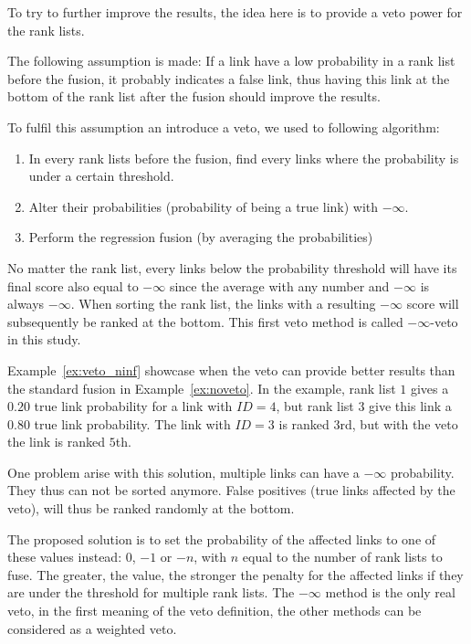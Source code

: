 To try to further improve the results, the idea here is to provide a veto power for the rank lists.

The following assumption is made:
If a link have a low probability in a rank list before the fusion, it probably indicates a false link, thus having this link at the bottom of the rank list after the fusion should improve the results.

To fulfil this assumption an introduce a veto, we used to following algorithm:

\begin{enumerate}
  \item In every rank lists before the fusion, find every links where the probability is under a certain threshold.
  \item Alter their probabilities (probability of being a true link) with $-\infty$.
  \item Perform the regression fusion (by averaging the probabilities)
\end{enumerate}

No matter the rank list, every links below the probability threshold will have its final score also equal to $-\infty$ since the average with any number and $-\infty$ is always $-\infty$.
When sorting the rank list, the links with a resulting $-\infty$ score will subsequently be ranked at the bottom.
This first veto method is called $-\infty$-veto in this study.

Example~\ref{ex:veto_ninf} showcase when the veto can provide better results than the standard fusion in Example~\ref{ex:noveto}.
In the example, rank list $1$ gives a $0.20$ true link probability for a link with $ID = 4$, but rank list $3$ give this link a $0.80$ true link probability.
The link with $ID = 3$ is ranked $3$rd, but with the veto the link is ranked $5$th.

One problem arise with this solution, multiple links can have a $-\infty$ probability.
They thus can not be sorted anymore.
False positives (true links affected by the veto), will thus be ranked randomly at the bottom.

The proposed solution is to set the probability of the affected links to one of these values instead: $0$, $-1$ or $-n$, with $n$ equal to the number of rank lists to fuse.
The greater, the value, the stronger the penalty for the affected links if they are under the threshold for multiple rank lists.
The $-\infty$ method is the only real veto, in the first meaning of the veto definition, the other methods can be considered as a weighted veto.

